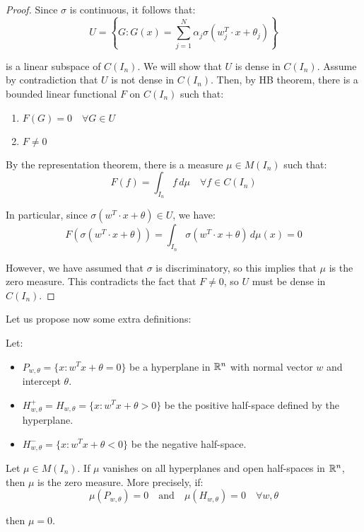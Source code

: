 \begin{proof}
    Since $\sigma$ is continuous, it follows that:
    $$U = \left\{ G : G(x) = \sum_{j=1}^{N} \alpha_j \sigma(w_j^T \cdot x + \theta_j) \right\}$$

    is a linear subspace of $C(I_n)$. We will show that $U$ is dense in $C(I_n)$. 
    Assume by contradiction that $U$ is not dense in $C(I_n)$. Then, by HB theorem,
    there is a bounded linear functional $F$ on $C(I_n)$ such that:
    \begin{enumerate}[label=(\roman*)]
        \item $F(G) = 0 \quad \forall G \in U$
        \item $F \neq 0$
    \end{enumerate}

    By the representation theorem, there is a measure $\mu \in M(I_n)$ such that:
    $$F(f) = \int_{I_n} f \, d\mu \quad \forall f \in C(I_n)$$

    In particular, since $\sigma(w^T \cdot x + \theta) \in U$, we have:
    $$F(\sigma(w^T \cdot x + \theta)) = \int_{I_n} \sigma(w^T \cdot x + \theta) \, d\mu(x) = 0$$

    However, we have assumed that $\sigma$ is discriminatory, so this implies that 
    $\mu$ is the zero measure. This contradicts the fact that $F \neq 0$, so $U$ must
    be dense in $C(I_n)$.

\end{proof}

Let us propose now some extra definitions:

\begin{definition}
    Let:
    \begin{itemize}
        \item $P_{w, \theta} = \{x: w^T x + \theta = 0\}$ be a hyperplane in $\mathbb{R}^n$ with
        normal vector $w$ and intercept $\theta$.

        \item $H_{w, \theta}^+ = H_{w, \theta} = \{x: w^T x + \theta > 0\}$ be the positive
        half-space defined by the hyperplane.

        \item $H_{w, \theta}^- = \{x: w^T x + \theta < 0\}$ be the negative half-space.
    \end{itemize}
\end{definition}

\begin{lemma}
    Let $\mu \in M(I_n)$. If $\mu$ vanishes on all hyperplanes and open half-spaces in
    $\mathbb{R}^n$, then $\mu$ is the zero measure. More precisely, if:
    $$\mu(P_{w, \theta}) = 0 \quad \text{and} \quad \mu(H_{w, \theta}) = 0 \quad \forall w, \theta$$

    then $\mu = 0$.
\end{lemma}

